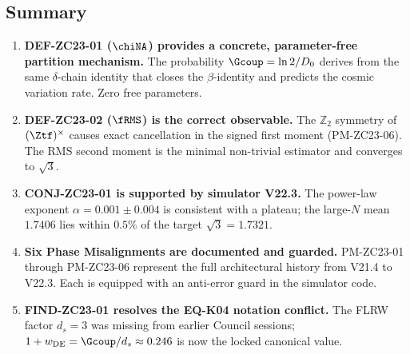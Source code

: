 \documentclass[12pt, a4paper]{article}
\begin{document}
\subsection{Summary}
\label{zc23:sec:summary}

\begin{enumerate}[leftmargin=*, label=\arabic*., noitemsep]

\item \textbf{DEF-ZC23-01 ($\chiNA$) provides a concrete, parameter-free
  partition mechanism.}
  The probability $\Gcoup = \ln2/D_0$ derives from the same
  $\delta$-chain identity that closes the $\beta$-identity and
  predicts the cosmic variation rate. Zero free parameters.

\item \textbf{DEF-ZC23-02 ($\fRMS$) is the correct observable.}
  The $\mathbb{Z}_2$ symmetry of $(\Ztf)^\times$ causes exact cancellation
  in the signed first moment (PM-ZC23-06). The RMS second moment
  is the minimal non-trivial estimator and converges to $\sqrt{3}$.

\item \textbf{CONJ-ZC23-01 is supported by simulator V22.3.}
  The power-law exponent $\alpha = 0.001\pm 0.004$ is consistent
  with a plateau; the large-$N$ mean $1.7406$ lies within $0.5\%$
  of the target $\sqrt{3}=1.7321$.

\item \textbf{Six Phase Misalignments are documented and guarded.}
  PM-ZC23-01 through PM-ZC23-06 represent the full architectural
  history from V21.4 to V22.3. Each is equipped with an anti-error
  guard in the simulator code.

\item \textbf{FIND-ZC23-01 resolves the EQ-K04 notation conflict.}
  The FLRW factor $d_s=3$ was missing from earlier Council sessions;
  $1+w_{\rm DE}=\Gcoup/d_s\approx0.246$ is now the locked canonical value.

\end{enumerate}

\bigskip
\end{document}
